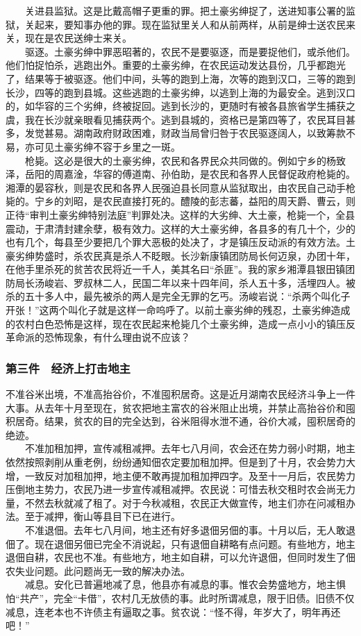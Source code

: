 \documentclass[cn,11pt,chinese]{elegantbook}
\def\myformat#1{\hfil\hfil #1}
\begin{document}
　　关进县监狱。这是比戴高帽子更重的罪。把土豪劣绅捉了，送进知事公署的监狱，关起来，要知事办他的罪。现在监狱里关人和从前两样，从前是绅士送农民来关，现在是农民送绅士来关。\\
　　驱逐。土豪劣绅中罪恶昭著的，农民不是要驱逐，而是要捉他们，或杀他们。他们怕捉怕杀，逃跑出外。重要的土豪劣绅，在农民运动发达县份，几乎都跑光了，结果等于被驱逐。他们中间，头等的跑到上海，次等的跑到汉口，三等的跑到长沙，四等的跑到县城。这些逃跑的土豪劣绅，以逃到上海的为最安全。逃到汉口的，如华容的三个劣绅，终被捉回。逃到长沙的，更随时有被各县旅省学生捕获之虞，我在长沙就亲眼看见捕获两个。逃到县城的，资格已是第四等了，农民耳目甚多，发觉甚易。湖南政府财政困难，财政当局曾归咎于农民驱逐阔人，以致筹款不易，亦可见土豪劣绅不容于乡里之一斑。\\
　　枪毙。这必是很大的土豪劣绅，农民和各界民众共同做的。例如宁乡的杨致泽，岳阳的周嘉淦，华容的傅道南、孙伯助，是农民和各界人民督促政府枪毙的。湘潭的晏容秋，则是农民和各界人民强迫县长同意从监狱取出，由农民自己动手枪毙的。宁乡的刘昭，是农民直接打死的。醴陵的彭志蕃，益阳的周天爵、曹云，则正待“审判土豪劣绅特别法庭”判罪处决。这样的大劣绅、大土豪，枪毙一个，全县震动，于肃清封建余孽，极有效力。这样的大土豪劣绅，各县多的有几十个，少的也有几个，每县至少要把几个罪大恶极的处决了，才是镇压反动派的有效方法。土豪劣绅势盛时，杀农民真是杀人不眨眼。长沙新康镇团防局长何迈泉，办团十年，在他手里杀死的贫苦农民将近一千人，美其名曰“杀匪”。我的家乡湘潭县银田镇团防局长汤峻岩、罗叔林二人，民国二年以来十四年间，杀人五十多，活埋四人。被杀的五十多人中，最先被杀的两人是完全无罪的乞丐。汤峻岩说：“杀两个叫化子开张！”这两个叫化子就是这样一命呜呼了。以前土豪劣绅的残忍，土豪劣绅造成的农村白色恐怖是这样，现在农民起来枪毙几个土豪劣绅，造成一点小小的镇压反革命派的恐怖现象，有什么理由说不应该？\\
\subsubsection*{\myformat{第三件　经济上打击地主}}
不准谷米出境，不准高抬谷价，不准囤积居奇。这是近月湖南农民经济斗争上一件大事。从去年十月至现在，贫农把地主富农的谷米阻止出境，并禁止高抬谷价和囤积居奇。结果，贫农的目的完全达到，谷米阻得水泄不通，谷价大减，囤积居奇的绝迹。\\
　　不准加租加押，宣传减租减押。去年七八月间，农会还在势力弱小时期，地主依然按照剥削从重老例，纷纷通知佃农定要加租加押。但是到了十月，农会势力大增，一致反对加租加押，地主便不敢再提加租加押四字。及至十一月后，农民势力压倒地主势力，农民乃进一步宣传减租减押。农民说：可惜去秋交租时农会尚无力量，不然去秋就减了租了。对于今秋减租，农民正大做宣传，地主们亦在问减租办法。至于减押，衡山等县目下已在进行。\\
　　不准退佃。去年七八月间，地主还有好多退佃另佃的事。十月以后，无人敢退佃了。现在退佃另佃已完全不消说起，只有退佃自耕略有点问题。有些地方，地主退佃自耕，农民也不准。有些地方，地主如自耕，可以允许退佃，但同时发生了佃农失业问题。此问题尚无一致的解决办法。\\
　　减息。安化已普遍地减了息，他县亦有减息的事。惟农会势盛地方，地主惧怕“共产”，完全“卡借”，农村几无放债的事。此时所谓减息，限于旧债。旧债不仅减息，连老本也不许债主有逼取之事。贫农说：“怪不得，年岁大了，明年再还吧！”\\
\end{document}

